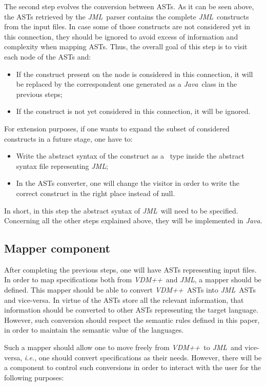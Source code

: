 \documentclass{llncs}
\newcommand{\jml}{\textit{JML}}
\newcommand{\vpp}{\textit{VDM++}}
\newcommand{\java}{\textit{Java}}
\newcommand{\ie}{\textit{i.e.}}
\begin{document}
\begin{itemize}
The second step evolves the conversion between ASTs. As it can be seen above, the ASTs retrieved by the \jml\ parser contains the complete \jml\ constructs from the input files. In case some of those constructs are not considered yet in this connection, they should be ignored to avoid excess of information and complexity when mapping ASTs. Thus, the overall goal of this step is to visit each node of the ASTs and:
\begin{itemize}
\item If the construct present on the node is considered in this connection, it will be replaced by the correspondent one generated as a \java\ class in the previous steps;
\item If the construct is not yet considered in this connection, it will be ignored.
\end{itemize} 
For extension purposes, if one wants to expand the subset of considered constructs in a future stage, one have to:
\begin{itemize}
\item Write the abstract syntax of the construct as a \vdm\ type inside the abstract syntax file representing \jml ;
\item In the ASTs converter, one will change the visitor in order to write the correct construct in the right place instead of null.
\end{itemize}
In short, in this step the abstract syntax of \jml\ will need to be specified. Concerning all the other steps explained above, they will be implemented in \java.
\end{itemize}

\subsection{Mapper component}
\label{chapter5:sec:mapper}

After completing the previous steps, one will have ASTs representing input files. In order to map specifications both from \vpp\ and \jml, a mapper should be defined. This mapper should be able to convert \vpp\ ASTs into \jml\ ASTs and vice-versa. In virtue of the ASTs store all the relevant information, that information should be converted to other ASTs representing the target language. However, such conversion should respect the semantic rules defined in this paper, in order to maintain the semantic value of the languages.

Such a mapper should allow one to move freely from \vpp\ to \jml\ and vice-versa, \ie, one should convert specifications as their needs. However, there will be a component to control such conversions in order to interact with the user for the following purposes:
\end{document}
